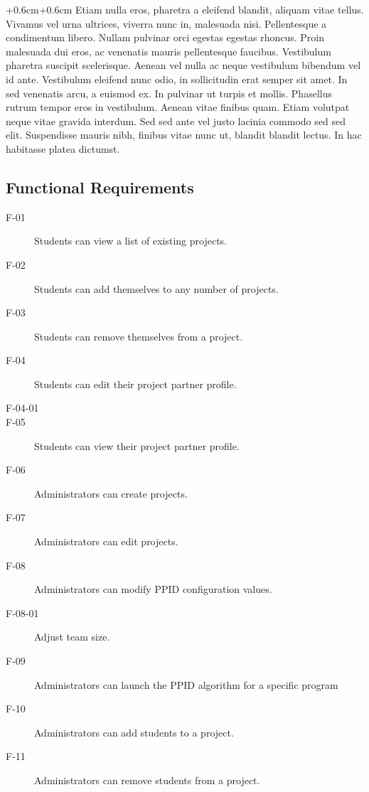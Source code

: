 \documentclass[english]{article}
\begin{document}
\begin{adjustwidth*}{+0.6cm}{+0.6cm}
{\large{}Etiam nulla eros, pharetra a eleifend blandit, aliquam vitae
tellus. Vivamus vel urna ultrices, viverra nunc in, malesuada nisi.
Pellentesque a condimentum libero. Nullam pulvinar orci egestas egestas
rhoncus. Proin malesuada dui eros, ac venenatis mauris pellentesque
faucibus. Vestibulum pharetra suscipit scelerisque. Aenean vel nulla
ac neque vestibulum bibendum vel id ante. Vestibulum eleifend nunc
odio, in sollicitudin erat semper sit amet. In sed venenatis arcu,
a euismod ex. In pulvinar ut turpis et mollis. Phasellus rutrum tempor
eros in vestibulum. Aenean vitae finibus quam. Etiam volutpat neque
vitae gravida interdum. Sed sed ante vel justo lacinia commodo sed
sed elit. Suspendisse mauris nibh, finibus vitae nunc ut, blandit
blandit lectus. In hac habitasse platea dictumst.}{\large \par}


\subsection{Functional Requirements}
\begin{description}
\item[F-01] {\large{}Students can view a list of existing projects.}{\large \par}
\item[F-02] {\large{}Students can add themselves to any number of projects.}{\large \par}
\item[F-03] {\large{}Students can remove themselves from a project.}{\large \par}
\item[F-04] {\large{}Students can edit their project partner profile.}{\large \par}
\item[F-04-01] {\large{}}{\large \par}
\item[F-05] {\large{}Students can view their project partner profile.}{\large \par}
\item[F-06] {\large{}Administrators can create projects.}{\large}
\item[F-07] {\large{}Administrators can edit projects.}{\large}
\item[F-08] {\large{}Administrators can modify PPID configuration values.}{\large \par}
\item[F-08-01] {\large{}Adjust team size.}{\large \par}
\item[F-09] {\large{}Administrators can launch the PPID algorithm for a specific program}{\large \par}
\item[F-10] {\large{}Administrators can add students to a project.}{\large \par}
\item[F-11] {\large{}Administrators can remove students from a project.}{\large \par}
\end{description}


\end{adjustwidth*}
\end{document}
